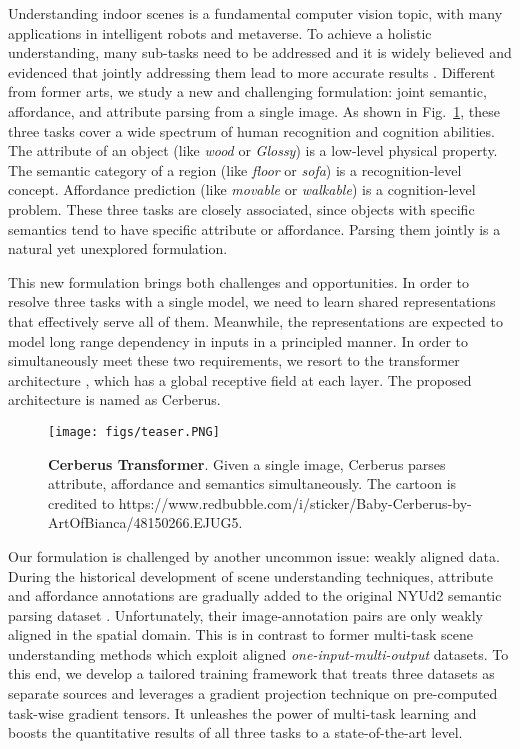 \documentclass[10pt,twocolumn,letterpaper]{article}
\begin{document}
Understanding indoor scenes is a fundamental computer vision topic, with many applications in intelligent robots and metaverse. To achieve a holistic understanding, many sub-tasks need to be addressed and it is widely believed and evidenced that jointly addressing them lead to more accurate results \cite{zhao2013scene}\cite{eigen2015predicting}\cite{song2017semantic}\cite{zamir2018taskonomy}\cite{han2020occuseg}. Different from former arts, we study a new and challenging formulation: joint semantic, affordance, and attribute parsing from a single image. As shown in Fig.~\ref{fig:teaser}, these three tasks cover a wide spectrum of human recognition and cognition abilities. The attribute of an object (like \emph{wood} or \emph{Glossy}) is a low-level physical property. The semantic category of a region (like \emph{floor} or \emph{sofa}) is a recognition-level concept. Affordance prediction (like \emph{movable} or \emph{walkable}) is a cognition-level problem. These three tasks are closely associated, since objects with specific semantics tend to have specific attribute or affordance. Parsing them jointly is a natural yet unexplored formulation. 

This new formulation brings both challenges and opportunities. In order to resolve three tasks with a single model, we need to learn shared representations that effectively serve all of them. Meanwhile, the representations are expected to model long range dependency in inputs in a principled manner. In order to simultaneously meet these two requirements, we resort to the transformer architecture \cite{vaswani2017attention}, which has a global receptive field at each layer. The proposed architecture is named as Cerberus.


\begin{figure}[t]
  \centering
  \texttt{[image: figs/teaser.PNG]}
  \caption{\textbf{Cerberus Transformer}. Given a single image, Cerberus parses attribute, affordance and semantics simultaneously. The cartoon is credited to https://www.redbubble.com/i/sticker/Baby-Cerberus-by-ArtOfBianca/48150266.EJUG5.}
  \label{fig:teaser} 
\end{figure}

Our formulation is challenged by another uncommon issue: weakly aligned data. During the historical development of scene understanding techniques, attribute \cite{zheng2014dense} and affordance \cite{roy2016multi} annotations are gradually added to the original NYUd2 semantic parsing dataset \cite{silberman2012indoor}. Unfortunately, their image-annotation pairs are only weakly aligned in the spatial domain. This is in contrast to former multi-task scene understanding methods which exploit aligned \emph{one-input-multi-output} datasets. To this end, we develop a tailored training framework that treats three datasets as separate sources and leverages a gradient projection technique on pre-computed task-wise gradient tensors. It unleashes the power of multi-task learning and boosts the quantitative results of all three tasks to a state-of-the-art level.
\end{document}
